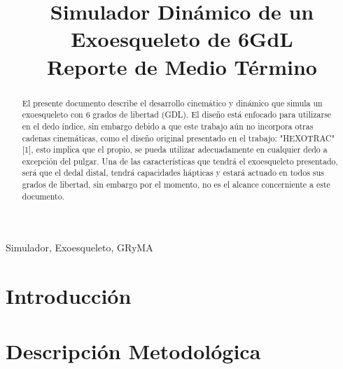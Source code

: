 \documentclass[journal]{IEEEtran}
\begin{document}
    \title{Simulador Dinámico de un Exoesqueleto de 6GdL\\
    \small{Reporte de Medio Término}}

    \author{
    }

    \maketitle

    \begin{abstract}
        El presente documento describe el desarrollo cinemático y dinámico que simula un exoesqueleto
        con 6 grados de libertad (GDL).
        \noindent El diseño está enfocado para utilizarse en el dedo índice, sin embargo debido a que
        este trabajo aún no incorpora otras cadenas cinemáticas, como el diseño original presentado en
        el trabajo: "HEXOTRAC"[1], esto implica que el propio, se pueda utilizar adecuadamente en
        cualquier dedo a excepción del pulgar. 
        \noindent Una de las características que tendrá el exoesqueleto presentado, será que el dedal
        distal, tendrá capacidades hápticas y estará actuado en todos sus grados de libertad,
        sin embargo por el momento, no es el alcance concerniente a este documento.         
    \end{abstract}

    \begin{IEEEkeywords}
    Simulador, Exoesqueleto, GRyMA
    \end{IEEEkeywords}

    \section{Introducción}

    \blindtext[0]

    \section{Descripción Metodológica}

    


    
\end{document}

